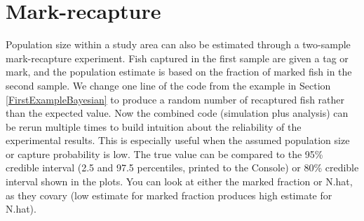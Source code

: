 \documentclass[
]{krantz}
\begin{document}
\hypertarget{MarkRecap}{%
\section{Mark-recapture}\label{MarkRecap}}

Population size within a study area can also be estimated through a two-sample mark-recapture experiment. Fish captured in the first sample are given a tag or mark, and the population estimate is based on the fraction of marked fish in the second sample. We change one line of the code from the example in Section \ref{FirstExampleBayesian} to produce a random number of recaptured fish rather than the expected value. Now the combined code (simulation plus analysis) can be rerun multiple times to build intuition about the reliability of the experimental results. This is especially useful when the assumed population size or capture probability is low. The true value can be compared to the 95\% credible interval (2.5 and 97.5 percentiles, printed to the Console) or 80\% credible interval shown in the plots. You can look at either the marked fraction or N.hat, as they covary (low estimate for marked fraction produces high estimate for N.hat).
\end{document}
